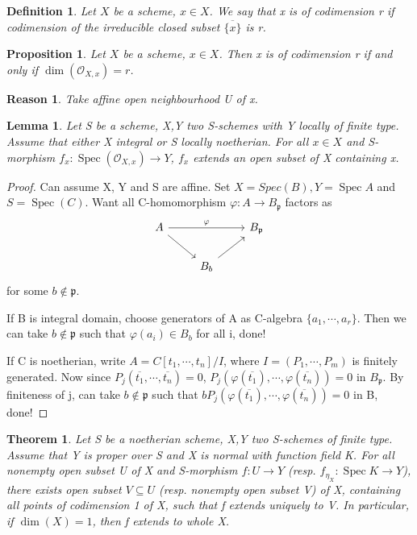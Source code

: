 \documentclass{ctexart}
\newtheorem{definition}{Definition}[section]
\newtheorem{theorem}{Theorem}[section]
\newtheorem{proposition}{Proposition}[section]
\newtheorem{lemma}{Lemma}[section]
\newtheorem{reason}{Reason}[section]
\newcommand{\spec}{\operatorname{Spec}}
\begin{document}
\begin{definition}
    Let $X$ be a scheme, $x\in X$.
    We say that x is of codimension r if codimension of the irreducible closed subset $\overline{\{x\}}$ is r.
\end{definition}
\begin{proposition}
    Let $X$ be a scheme, $x\in X$.
    Then x is of codimension r if and only if $\dim(\mathcal{O}_{X, x}) = r$.
    \label{Proposition 5.1}
\end{proposition}
\begin{reason}
    Take affine open neighbourhood U of x.
\end{reason}
\begin{lemma}
    Let S be a scheme, X,Y two S-schemes with Y locally of finite type.
    Assume that either X integral or S locally noetherian.
    For all $x\in X$ and S-morphism $f_{x}: \spec(\mathcal{O}_{X, x}) \longrightarrow Y$,
    $f_{x}$ extends an open subset of X containing x.
    \label{Lemma 5.1}
\end{lemma}
\begin{proof}
    Can assume X, Y and S are affine.
    Set $X =Spec(B), Y = \spec A$ and $S = \spec(C)$.
    Want all C-homomorphism $\varphi: A \longrightarrow B_{\mathfrak{p}}$ factors as 
    \begin{equation*}
        \begin{tikzcd}
            A \arrow[rr, "\varphi"] \arrow[dr] &&
            B_{\mathfrak{p}} \\
            & B_{b} \arrow[ur] &
        \end{tikzcd}
    \end{equation*}
    for some $b\notin \mathfrak{p}$.
    \par
    If B is integral domain, choose generators of A as C-algebra $\{a_{1}, \cdots, a_{r}\}$.
    Then we can take $b\notin \mathfrak{p}$ such that $\varphi(a_{i})\in B_{b}$ for all i, done!
    \par
    If C is noetherian, write $A = C[t_{1}, \cdots, t_{n}]/I$, where $I = (P_{1}, \cdots, P_{m})$ is finitely generated.
    Now since $P_{j}(\overline{t_{1}}, \cdots, \overline{t_{n}}) = 0$, $P_{j}(\varphi(\overline{t_{1}}), \cdots, \varphi(\overline{t_{n}})) = 0$ in $B_{\mathfrak{p}}$.
    By finiteness of j, can take $b\notin \mathfrak{p}$ such that $bP_{j}(\varphi(\overline{t_{1}}), \cdots, \varphi(\overline{t_{n}})) = 0$ in B, done!
\end{proof}
\begin{theorem}
    Let S be a noetherian scheme, X,Y two S-schemes of finite type.
    Assume that Y is proper over S and X is normal with function field K.
    For all nonempty open subset U of X and S-morphism $f: U \longrightarrow Y$ (resp. $f_{\eta_{X}}: \spec K \longrightarrow Y$),
    there exists open subset $V \subseteq U$ (resp. nonempty open subset V) of X, containing all points of codimension 1 of X, such that f extends uniquely to V.  
    In particular, if $\dim(X) = 1$, then f extends to whole X.
    \label{Theorem 5.2}
\end{theorem}
\end{document}
